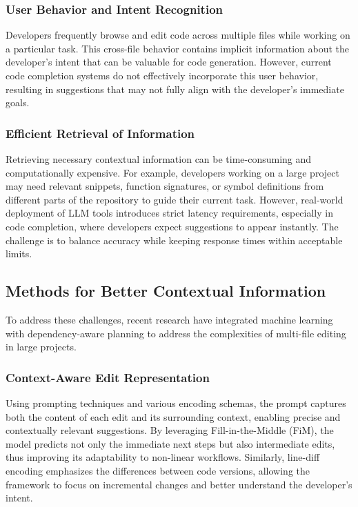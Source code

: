 \subsubsection{User Behavior and Intent Recognition}
Developers frequently browse and edit code across multiple files while working on a particular task. This cross-file behavior contains implicit information about the developer’s intent that can be valuable for code generation. However, current code completion systems do not effectively incorporate this user behavior, resulting in suggestions that may not fully align with the developer’s immediate goals. 

\subsubsection{Efficient Retrieval of Information}
Retrieving necessary contextual information can be time-consuming and computationally expensive. For example, developers working on a large project may need relevant snippets, function signatures, or symbol definitions from different parts of the repository to guide their current task. However, real-world deployment of LLM tools introduces strict latency requirements, especially in code completion, where developers expect suggestions to appear instantly. The challenge is to balance accuracy while keeping response times within acceptable limits.


\subsection{Methods for Better Contextual Information}

To address these challenges, recent research have integrated machine learning with dependency-aware planning to address the complexities of multi-file editing in large projects.

\subsubsection{Context-Aware Edit Representation}

Using prompting techniques and various encoding schemas, the prompt captures both the content of each edit and its surrounding context, enabling precise and contextually relevant suggestions. By leveraging Fill-in-the-Middle (FiM), the model predicts not only the immediate next steps but also intermediate edits, thus improving its adaptability to non-linear workflows. Similarly, line-diff encoding emphasizes the differences between code versions, allowing the framework to focus on incremental changes and better understand the developer's intent.

